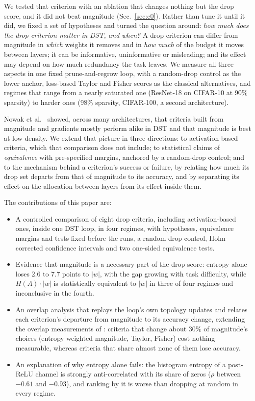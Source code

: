 We tested that criterion with an ablation that changes nothing but the drop score, and it did not beat magnitude (Sec.~\ref{sec:c0}). Rather than tune it until it did, we fixed a set of hypotheses and turned the question around: \emph{how much does the drop criterion matter in DST, and when?} A drop criterion can differ from magnitude in \emph{which} weights it removes and in \emph{how much} of the budget it moves between layers; it can be informative, uninformative or misleading; and its effect may depend on how much redundancy the task leaves. We measure all three aspects in one fixed prune-and-regrow loop, with a random-drop control as the lower anchor, loss-based Taylor and Fisher scores as the classical alternatives, and regimes that range from a nearly saturated one (ResNet-18 on CIFAR-10 at 90\% sparsity) to harder ones (98\% sparsity, CIFAR-100, a second architecture).

Nowak et al.\ \cite{nowak2023fantastic} showed, across many architectures, that criteria built from magnitude and gradients mostly perform alike in DST and that magnitude is best at low density. We extend that picture in three directions: to activation-based criteria, which that comparison does not include; to statistical claims of \emph{equivalence} with pre-specified margins, anchored by a random-drop control; and to the mechanism behind a criterion's success or failure, by relating how much its drop set departs from that of magnitude to its accuracy, and by separating its effect on the allocation between layers from its effect inside them.

The contributions of this paper are:
\begin{itemize}
    \item A controlled comparison of eight drop criteria, including activation-based ones, inside one DST loop, in four regimes, with hypotheses, equivalence margins and tests fixed before the runs, a random-drop control, Holm-corrected confidence intervals and two one-sided equivalence tests.
    \item Evidence that magnitude is a necessary part of the drop score: entropy alone loses 2.6 to 7.7 points to $|w|$, with the gap growing with task difficulty, while $H(A)\cdot|w|$ is statistically equivalent to $|w|$ in three of four regimes and inconclusive in the fourth.
    \item An overlap analysis that replays the loop's own topology updates and relates each criterion's departure from magnitude to its accuracy change, extending the overlap measurements of \cite{nowak2023fantastic}: criteria that change about 30\% of magnitude's choices (entropy-weighted magnitude, Taylor, Fisher) cost nothing measurable, whereas criteria that share almost none of them lose accuracy.
    \item An explanation of why entropy alone fails: the histogram entropy of a post-ReLU channel is strongly anti-correlated with its share of zeros ($\rho$ between $-0.61$ and $-0.93$), and ranking by it is worse than dropping at random in every regime.
\end{itemize}
